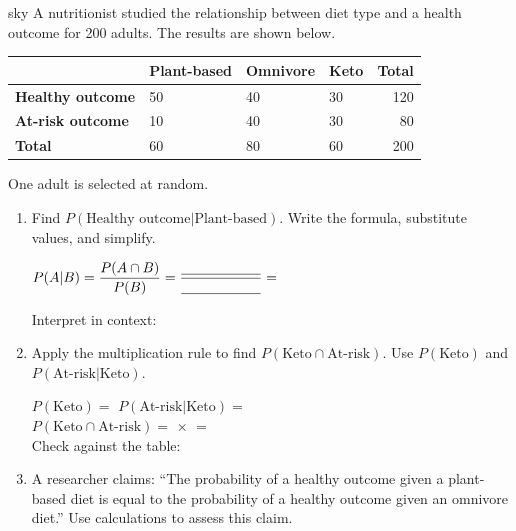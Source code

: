 \documentclass[10pt]{article}
\begin{document}
\namedateperiod

\vspace{0.14in}

\begin{scenariobox}[Context]{sky}
\small
A nutritionist studied the relationship between diet type and a health outcome
for 200 adults. The results are shown below.

\vspace{6pt}
\renewcommand{\arraystretch}{1.4}
\begin{tabularx}{\linewidth}{@{} l X X X r @{}}
 & \textbf{Plant-based} & \textbf{Omnivore} & \textbf{Keto} & \textbf{Total} \\
\hline
\textbf{Healthy outcome}  & 50 & 40 & 30 & 120 \\
\textbf{At-risk outcome}  & 10 & 40 & 30 & 80 \\
\hline
\textbf{Total}            & 60 & 80 & 60 & 200 \\
\end{tabularx}

\vspace{4pt}
One adult is selected at random.
\end{scenariobox}

\vspace{0.1in}

\begin{practicebox}
\small
\begin{enumerate}[leftmargin=1.5em, itemsep=14pt]
  \item Find $P(\text{Healthy outcome} | \text{Plant-based})$. Write the formula,
        substitute values, and simplify.

        \vspace{4pt}
        $P(A|B) = \dfrac{P(A \cap B)}{P(B)} = \dfrac{\blank{2cm}}{\blank{2cm}} = $ \blank{3cm}

        Interpret in context: \writeline\writeline

  \item Apply the multiplication rule to find $P(\text{Keto} \cap \text{At-risk})$.
        Use $P(\text{Keto})$ and $P(\text{At-risk}|\text{Keto})$.

        \vspace{4pt}
        $P(\text{Keto}) = $ \blank{3cm} \quad $P(\text{At-risk}|\text{Keto}) = $ \blank{3cm}\\[4pt]
        $P(\text{Keto} \cap \text{At-risk}) = $ \blank{3cm} $\times$ \blank{3cm} $=$ \blank{3cm}\\[4pt]
        Check against the table: \blank{4cm}

  \item A researcher claims: ``The probability of a healthy outcome given a plant-based
        diet is equal to the probability of a healthy outcome given an omnivore diet.''
        Use calculations to assess this claim.\\
        \writeline\\[1pt]\writeline\\[1pt]\writeline
\end{enumerate}
\end{practicebox}
\end{document}
